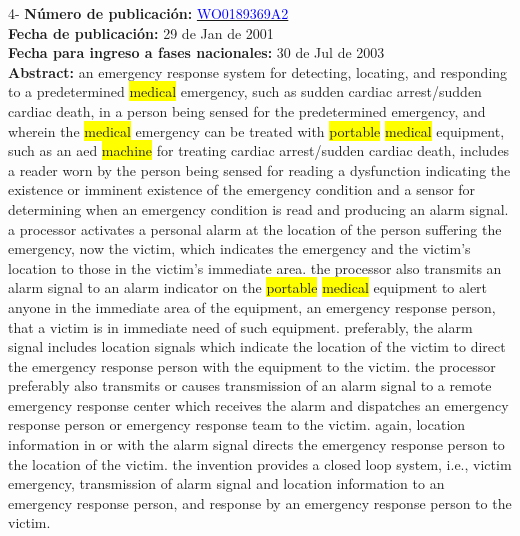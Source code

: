  \vspace{1cm}4- \textbf{Número de publicación:} \href{https://worldwide.espacenet.com/publicationDetails/biblio?DB=EPODOC&II=0&ND=3&adjacent=true&locale=en_EP&FT=D&date=20160331&CC=WO&NR=0189369A2&KC=#}{\textcolor{blue}{WO0189369A2}}\\ 
\textbf{Fecha de publicación:} 29 de Jan de 2001\\ 
\textbf{Fecha para ingreso a fases nacionales:} 30 de Jul de 2003\\ 
\textbf{Abstract:} an emergency response system for detecting, locating, and responding to a predetermined \colorbox{yellow}{medical} emergency, such as sudden cardiac arrest/sudden cardiac death, in a person being sensed for the predetermined emergency, and wherein the \colorbox{yellow}{medical} emergency can be treated with \colorbox{yellow}{\colorbox{yellow}{portable}} \colorbox{yellow}{medical} equipment, such as an aed \colorbox{yellow}{machine} for treating cardiac arrest/sudden cardiac death, includes a reader worn by the person being sensed for reading a dysfunction indicating the existence or imminent existence of the emergency condition and a sensor for determining when an emergency condition is read and producing an alarm signal. a processor activates a personal alarm at the location of the person suffering the emergency, now the victim, which indicates the emergency and the victim's location to those in the victim's immediate area. the processor also transmits an alarm signal to an alarm indicator on the \colorbox{yellow}{\colorbox{yellow}{portable}} \colorbox{yellow}{medical} equipment to alert anyone in the immediate area of the equipment, an emergency response person, that a victim is in immediate need of such equipment. preferably, the alarm signal includes location signals which indicate the location of the victim to direct the emergency response person with the equipment to the victim. the processor preferably also transmits or causes transmission of an alarm signal to a remote emergency response center which receives the alarm and dispatches an emergency response person or emergency response team to the victim. again, location information in or with the alarm signal directs the emergency response person to the location of the victim. the invention provides a closed loop system, i.e., victim emergency, transmission of alarm signal and location information to an emergency response person, and response by an emergency response person to the victim.\\ 
 

